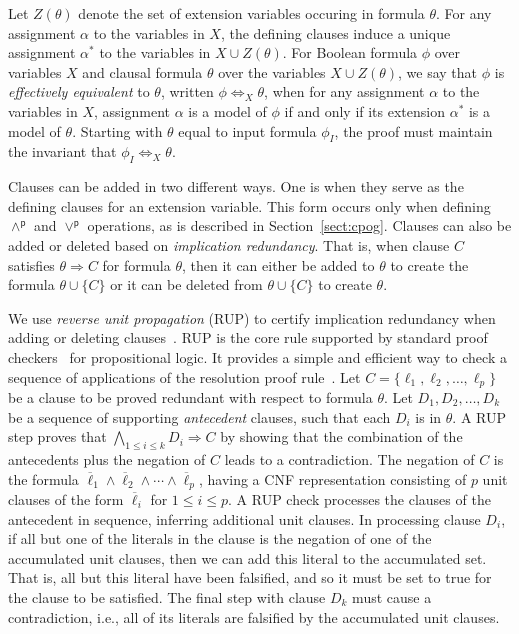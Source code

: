 \documentclass[twoside,11pt]{article}
\newcommand{\pand}{\mathbin{\land^\textsf{p}}}
\newcommand{\por}{\mathbin{\lor^\textsf{p}}}
\newcommand{\obar}[1]{\overline{#1}}
\newcommand{\lit}{\ell}
\newcommand{\varset}{X}
\newcommand{\exvarset}{Z}
\newcommand{\imply}{\Rightarrow}
\newcommand{\ifandonlyif}{\Leftrightarrow}
\newcommand{\eequiv}{\ifandonlyif_{\varset}}
\newcommand{\extend}[1]{#1^{*}}
\newcommand{\assign}{\alpha}
\newcommand{\eassign}{\extend{\alpha}}
\newcommand{\inputformula}{\phi_I}
\begin{document}
Let $\exvarset(\theta)$
denote the set of extension variables occuring in formula $\theta$.
For any assignment $\assign$ to the variables in $\varset$, the defining
clauses induce a unique assignment $\eassign$ to the variables in $\varset
\cup \exvarset(\theta)$.  For Boolean formula $\phi$ over variables
$\varset$ and clausal
formula $\theta$ over the variables $\varset \cup \exvarset(\theta)$, we say that $\phi$ is {\em
  effectively equivalent} to $\theta$, written
$\phi \eequiv \theta$,
when for any assignment
$\assign$ to the variables in $\varset$, assignment $\assign$ is a model of $\phi$ if
and only if its extension $\eassign$ is a model of $\theta$.
Starting with  $\theta$ equal to input formula $\inputformula$,
the proof must maintain the invariant that
$\inputformula \eequiv \theta$.

Clauses can be added in two different ways.  One is when they serve as
the defining clauses for an extension variable.  This form
occurs only when defining $\pand$ and $\por$ operations, as is
described in Section~\ref{sect:cpog}.  Clauses can also be added or
deleted based on \emph{implication redundancy}.  That is, when clause
$C$ satisfies $\theta \imply C$ for formula $\theta$, then it can either
be added to $\theta$ to create the formula $\theta \cup \{C\}$ or it can be deleted
from $\theta \cup \{C\}$ to create $\theta$.

We use \emph{reverse unit propagation} (RUP) to certify
implication redundancy when adding or deleting
clauses~\cite{goldberg,vangelder08_verifying_rup_proofs}.
RUP
is the core rule supported by standard
proof checkers~\cite{heule:cade:2013,wetzler14_drattrim} for propositional logic. It provides a simple and efficient
way to check a sequence of applications of the resolution proof rule~\cite{robinson-1965}.
Let $C = \{\lit_1, \lit_2, \ldots,\lit_p\}$ be a clause to be
proved redundant with respect to formula $\theta$.  Let $D_1, D_2, \ldots, D_k$ be a sequence of supporting
\emph{antecedent} clauses, such that each $D_i$ is in $\theta$.
A RUP step
proves that $\bigwedge_{1\leq i \leq k} D_i \imply C$ by showing
that the combination of the antecedents plus the negation of $C$ leads
to a contradiction.  The negation of $C$ is the formula
$\overline{\lit}_1 \land \overline{\lit}_2 \land \cdots \land
\overline{\lit}_p$, having a CNF representation consisting of $p$ unit
clauses of the form $\obar{\lit}_i$ for $1 \leq i \leq p$.  A RUP
check processes the clauses of the antecedent in sequence, inferring
additional unit clauses.  In processing clause $D_i$, if all but one
of the literals in the clause is the negation of one of the
accumulated unit clauses, then we can add this literal to the
accumulated set.  That is, all but this literal have been falsified,
and so it must be set to true for the clause to be satisfied.  The
final step with clause $D_k$ must cause a contradiction, i.e., all of
its literals are falsified by the accumulated unit clauses.
\end{document}
